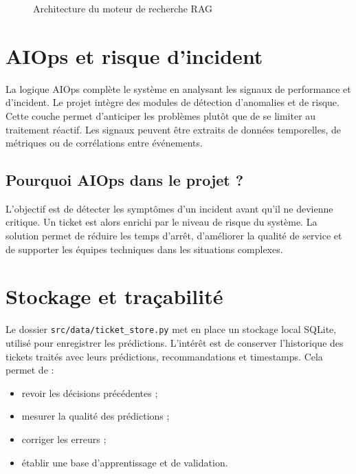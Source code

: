 \documentclass[11pt,a4paper]{report}
\begin{document}
\begin{figure}[H]
\centering
{}
\caption{Architecture du moteur de recherche RAG}
\end{figure}

\section{AIOps et risque d’incident}
La logique AIOps complète le système en analysant les signaux de performance et d’incident. Le projet intègre des modules de détection d’anomalies et de risque. Cette couche permet d’anticiper les problèmes plutôt que de se limiter au traitement réactif. Les signaux peuvent être extraits de données temporelles, de métriques ou de corrélations entre événements.

\subsection{Pourquoi AIOps dans le projet ?}
L’objectif est de détecter les symptômes d’un incident avant qu’il ne devienne critique. Un ticket est alors enrichi par le niveau de risque du système. La solution permet de réduire les temps d’arrêt, d’améliorer la qualité de service et de supporter les équipes techniques dans les situations complexes.

\section{Stockage et traçabilité}
Le dossier \texttt{src/data/ticket\_store.py} met en place un stockage local SQLite, utilisé pour enregistrer les prédictions. L’intérêt est de conserver l’historique des tickets traités avec leurs prédictions, recommandations et timestamps. Cela permet de :
\begin{itemize}[leftmargin=1.3em]
    \item revoir les décisions précédentes ;
    \item mesurer la qualité des prédictions ;
    \item corriger les erreurs ;
    \item établir une base d’apprentissage et de validation.
\end{itemize}
\end{document}
